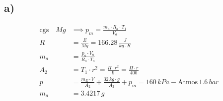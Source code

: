 

\subsection*{a)}

\begin{align*}
\text{cgs} \quad Mg & \implies p_m = \frac{m_a \cdot R_a \cdot T_1}{V_a} \\
R &= \frac{E}{Mg} = 166.28 \, \frac{J}{kg \cdot K} \\
m_a &= \frac{p_a \cdot V_a}{R_a \cdot T_a} \\
A_2 &= T_1 \cdot r^2 = \frac{\Pi \cdot r^2}{9} = \frac{\Pi \cdot r}{400} \\
p &= \frac{m_E \cdot V}{A_2} + \frac{32 \, kg \cdot g}{A_2} + p_m = 160 \, kPa - \text{Atmos} \, 1.6 \, bar \\
m_a &= 3.4217 \, g
\end{align*}
